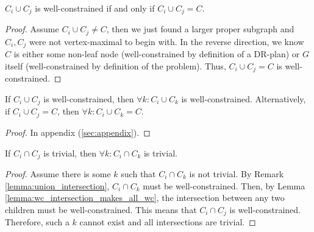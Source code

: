 \begin{lemma}\label{lemma:wc_intersection_is_C}
$C_i\cup C_j$ is well-constrained if and only if $C_i\cup C_j = C$.
\end{lemma}
%
\begin{proof}
Assume $C_i\cup C_j \neq C$, then we just found a larger proper subgraph and $C_i,C_j$ were not vertex-maximal to begin with.
%
In the reverse direction, we know $C$ is either some non-leaf node (well-constrained by definition of a DR-plan) or $G$ itself (well-constrained by definition of the problem). Thus, $C_i\cup C_j=C$ is well-constrained.
\end{proof}
%
%
%
\begin{lemma}\label{lemma:wc_intersection_makes_all_wc}
If $C_i\cup C_j$ is well-constrained, then $\forall k: C_i\cup C_k$ is well-constrained.
Alternatively, if $C_i\cup C_j=C$, then $\forall k: C_i\cup C_k=C$.
\end{lemma}
%
\begin{proof}
In appendix (\ref{sec:appendix}).
\end{proof}
%
%
%
\begin{lemma}\label{lemma:uc_intersection_makes_all_uc}
If $C_i\cap C_j$ is trivial, then $\forall k: C_i\cap C_k$ is trivial.
\end{lemma}
%
\begin{proof}
Assume there is some $k$ such that $C_i\cap C_k$ is not trivial. By Remark \ref{lemma:union_intersection}, $C_i\cap C_k$ must be well-constrained. Then, by Lemma \ref{lemma:wc_intersection_makes_all_wc}, the intersection between any two children must be well-constrained. This means that $C_i\cap C_j$ is well-constrained. Therefore, such a $k$ cannot exist and all intersections are trivial.
\end{proof}






